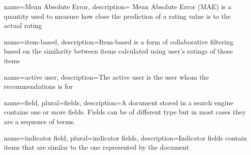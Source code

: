 {
name={Mean Absolute Error},
description={ Mean Absolute Error (MAE) is a quantity used to measure how close the prediction of a rating value is to the actual rating}
}

{
name={item-based},
description={Item-based is a form of collaborative filtering based on the similarity between items calculated using user's ratings of those items \cite{jannach11}
}
}

{
name={active user},
description={The active user is the user whom the recommendations is for}
}

{
name={field},
plural={fields},
description={A document stored in a search engine  contains one or more fields. Fields can be of different type but in most cases they are a sequence of terms.}
}

{
name={indicator field},
plural={indicator fields},
description={Indicator fields contain items that are similar to the one represented by the document}
}
